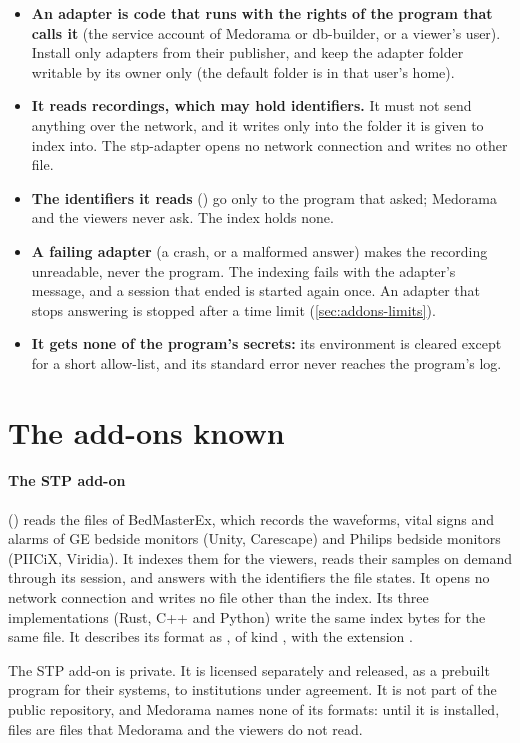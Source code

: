 \begin{itemize}
\item \textbf{An adapter is code that runs with the rights of the program that calls it} (the
  service account of Medorama or db-builder, or a viewer's user). Install only adapters from their publisher, and
  keep the adapter folder writable by its owner only (the default folder is in that user's home).
\item \textbf{It reads recordings, which may hold identifiers.} It must not send anything over the
  network, and it writes only into the folder it is given to index into. The stp-adapter opens no
  network connection and writes no other file.
\item \textbf{The identifiers it reads} () go only to the program that asked;
  Medorama and the viewers never ask. The index holds none.
\item \textbf{A failing adapter} (a crash, or a malformed answer) makes the recording unreadable,
  never the program. The indexing fails with the adapter's message, and a session that ended is
  started again once. An adapter that stops answering is stopped after a time limit
  (\cref{sec:addons-limits}).
\item \textbf{It gets none of the program's secrets:} its environment is cleared except for a
  short allow-list, and its standard error never reaches the program's log.
\end{itemize}

\section{The add-ons known}
\label{sec:addons-known}

\paragraph{The STP add-on} () reads the  files of BedMasterEx,
which records the waveforms, vital signs and alarms of GE bedside monitors (Unity, Carescape) and
Philips bedside monitors (PIICiX, Viridia). It indexes them for the viewers, reads their samples
on demand through its  session, and answers  with the identifiers the
file states. It opens no network connection and writes no file other than the index. Its three
implementations (Rust, C++ and Python) write the same index bytes for the same file. It describes its
format as , of kind , with the extension .

\begin{note}[License]
The STP add-on is private. It is licensed separately and released, as a prebuilt program for
their systems, to institutions under agreement. It is not part of the public repository, and
Medorama names none of its formats: until it is installed,  files are files that
Medorama and the viewers do not read.
\end{note}
